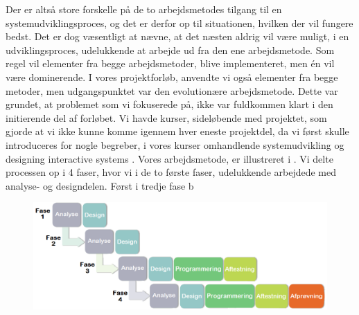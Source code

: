 Der er altså store forskelle på de to arbejdsmetodes tilgang til en systemudviklingsproces, og det er derfor op til situationen, hvilken der vil fungere bedst. Det er dog væsentligt at nævne, at det næsten aldrig vil være muligt, i en udviklingsproces, udelukkende at arbejde ud fra den ene arbejdsmetode. Som regel vil elementer fra begge arbejdsmetoder, blive implementeret, men én vil være dominerende. I vores projektforløb, anvendte vi også elementer fra begge metoder, men udgangspunktet var den evolutionære arbejdsmetode. Dette var grundet, at problemet som vi fokuserede på, ikke var fuldkommen klart i den initierende del af forløbet. Vi havde kurser, sideløbende med projektet, som gjorde at vi ikke kunne komme igennem hver eneste projektdel, da vi først skulle introduceres for nogle begreber, i vores kurser omhandlende systemudvikling \cite{ooad} og designing interactive systems \cite{deb}. Vores arbejdsmetode, er illustreret i . Vi delte processen op i 4 faser, hvor vi i de to første faser, udelukkende arbejdede med analyse- og designdelen. Først i tredje fase b  

\begin{figure}[h]
		\centering
		\includegraphics[scale=0.5]{billeder/blandingsmetode.png}
  		\label{fig:blandingsmetode}
\end{figure}





